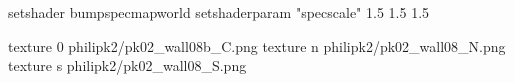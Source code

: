 setshader bumpspecmapworld
setshaderparam "specscale" 1.5 1.5 1.5

texture 0 philipk2/pk02_wall08b_C.png
texture n philipk2/pk02_wall08_N.png
texture s philipk2/pk02_wall08_S.png

